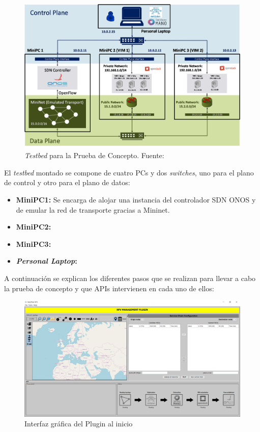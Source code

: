 \begin{figure}[!ht]
	\centering
	\includegraphics[width=0.9\linewidth]{imagenes/PoC_testbed}
	\caption{\textit{Testbed} para la Prueba de Concepto. Fuente:\cite{demoecocbib}}
	\label{fig:poctestbed}
\end{figure}

El \textit{testbed} montado se compone de cuatro \acp{PC} y dos \textit{switches}, uno para el plano de control y otro para el plano de datos:

\begin{itemize}
	\item \textbf{Mini\ac{PC}1:} Se encarga de alojar una instancia del controlador \ac{SDN} \ac{ONOS} y de emular la red de transporte gracias a Mininet.
	
	\item \textbf{Mini\ac{PC}2:} 
	
	\item \textbf{Mini\ac{PC}3:} 
	
	\item \textbf{\textit{Personal Laptop}:} 
\end{itemize}


A continuación se explican los diferentes pasos que se realizan para llevar a cabo la prueba de concepto y que APIs intervienen en cada uno de ellos:

\begin{figure}[!ht]
	\centering
	\includegraphics[width=0.9\linewidth]{imagenes/nfvplugin_dashboard}
	\caption{Interfaz gráfica del Plugin al inicio}
	\label{fig:nfvproof_inicio}
\end{figure}


